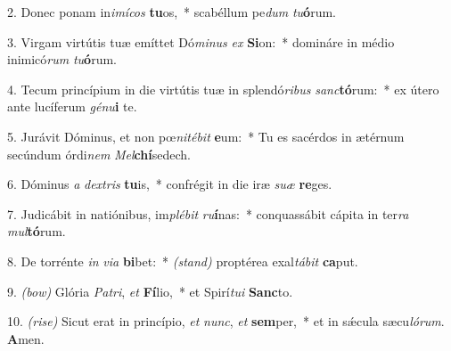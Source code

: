  2. Donec ponam in\textit{i}\textit{mí}\textit{cos} \textbf{tu}os,~* 
 	scabéllum pe\textit{dum} \textit{tu}\textbf{ó}rum.

3. Virgam virtútis tuæ emíttet Dó\textit{mi}\textit{nus} \textit{ex} \textbf{Si}on:~* 
	domináre in médio inimicó\textit{rum} \textit{tu}\textbf{ó}rum.

4. Tecum princípium in die virtútis tuæ in splendó\textit{ri}\textit{bus} \textit{sanc}\textbf{tó}rum:~* 
	ex útero ante lucíferum \textit{gé}\textit{nu}\textbf{i} te.

5. Jurávit Dóminus, et non pœ\textit{ni}\textit{té}\textit{bit} \textbf{e}um:~* 
	Tu es sacérdos in ætérnum secúndum órdi\textit{nem} \textit{Mel}\textbf{chí}sedech.

6. Dóminus \textit{a} \textit{dex}\textit{tris} \textbf{tu}is,~* 
	confrégit in die iræ \textit{su}\textit{æ} \textbf{re}ges.

7. Judicábit in natiónibus, im\textit{plé}\textit{bit} \textit{ru}\textbf{í}nas:~* 
	conquassábit cápita in ter\textit{ra} \textit{mul}\textbf{tó}rum.

8. De torrénte \textit{in} \textit{vi}\textit{a} \textbf{bi}bet:~* 
	{\color{red}\textit{(stand)}} proptérea exal\textit{tá}\textit{bit} \textbf{ca}put.

9. {\color{red}\textit{(bow)}} Glória \textit{Pa}\textit{tri}, \textit{et} \textbf{Fí}lio,~*
	et Spirí\textit{tu}\textit{i} \textbf{Sanc}to.

10. {\color{red}\textit{(rise)}} Sicut erat in princípio, \textit{et} \textit{nunc}, \textit{et} \textbf{sem}per,~* 
	et in s\'{\ae}cula sæcu\textit{ló}\textit{rum}. \textbf{A}men.